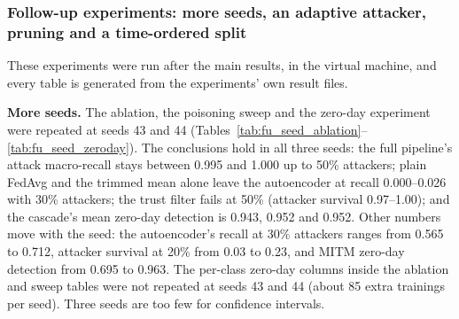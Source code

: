 \subsubsection{Follow-up experiments: more seeds, an adaptive attacker, pruning and a time-ordered split}\label{sec:followups}
These experiments were run after the main results, in the virtual machine, and every table is generated from the experiments' own result files.

\textbf{More seeds.} The ablation, the poisoning sweep and the zero-day experiment were repeated at seeds 43 and 44 (Tables~\ref{tab:fu_seed_ablation}--\ref{tab:fu_seed_zeroday}). The conclusions hold in all three seeds: the full pipeline's attack macro-recall stays between 0.995 and 1.000 up to 50\% attackers; plain FedAvg and the trimmed mean alone leave the autoencoder at recall 0.000--0.026 with 30\% attackers; the trust filter fails at 50\% (attacker survival 0.97--1.00); and the cascade's mean zero-day detection is 0.943, 0.952 and 0.952. Other numbers move with the seed: the autoencoder's recall at 30\% attackers ranges from 0.565 to 0.712, attacker survival at 20\% from 0.03 to 0.23, and MITM zero-day detection from 0.695 to 0.963. The per-class zero-day columns inside the ablation and sweep tables were not repeated at seeds 43 and 44 (about 85 extra trainings per seed). Three seeds are too few for confidence intervals.

